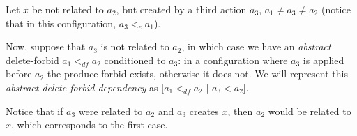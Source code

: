 \begin{definition}
\begin{description}[style=nextline]
\item [Unrelated element absent from the initial graph:]
Let $x$ be not related to $a_2$, but created by a third action $a_3$, $a_1 \ne a_3 \ne a_2$ (notice that in this configuration, $a_3 <_{e} a_1$). 

Now, suppose that $a_3$ is not related to $a_2$, in which case we have an \emph{abstract} delete-forbid $a_1 <_{df} a_2$ conditioned to $a_3$: in a configuration where $a_3$ is applied before $a_2$ the produce-forbid exists, otherwise it does not. We will represent this \emph{abstract delete-forbid dependency} as $[a_1 <_{df} a_2$ | $a_3 < a_2 ]$.
  
Notice that if $a_3$ were related to $a_2$ and $a_3$ creates $x$, then $a_2$ would be related to $x$, which corresponds to the first case.
\end{description}
\end{definition}

